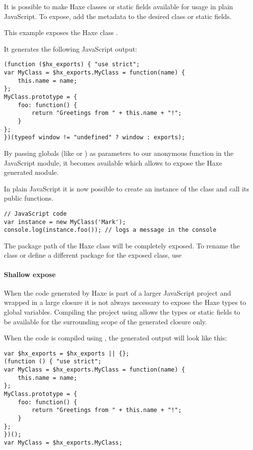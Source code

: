 It is possible to make Haxe classes or static fields available for usage in plain JavaScript. 
To expose, add the  metadata to the desired class or static fields.

This example exposes the Haxe class .


It generates the following JavaScript output:

\begin{lstlisting}
(function ($hx_exports) { "use strict";
var MyClass = $hx_exports.MyClass = function(name) {
	this.name = name;
};
MyClass.prototype = {
	foo: function() {
		return "Greetings from " + this.name + "!";
	}
};
})(typeof window != "undefined" ? window : exports);
\end{lstlisting}

By passing globals (like  or ) as parameters to our anonymous function in the JavaScript module, it becomes available which allows to expose the Haxe generated module.

In plain JavaScript it is now possible to create an instance of the class and call its public functions.

\begin{lstlisting}
// JavaScript code
var instance = new MyClass('Mark');
console.log(instance.foo()); // logs a message in the console
\end{lstlisting}

The package path of the Haxe class will be completely exposed. To rename the class or define a different package for the exposed class, use 

\paragraph{Shallow expose}

When the code generated by Haxe is part of a larger JavaScript project and wrapped in a large closure it is not always necessary to expose the Haxe types to global variables.
Compiling the project using  allows the types or static fields to be available for the surrounding scope of the generated closure only.

When the code is compiled using , the generated output will look like this:

\begin{lstlisting}
var $hx_exports = $hx_exports || {};
(function () { "use strict";
var MyClass = $hx_exports.MyClass = function(name) {
	this.name = name;
};
MyClass.prototype = {
	foo: function() {
		return "Greetings from " + this.name + "!";
	}
};
})();
var MyClass = $hx_exports.MyClass;
\end{lstlisting}

